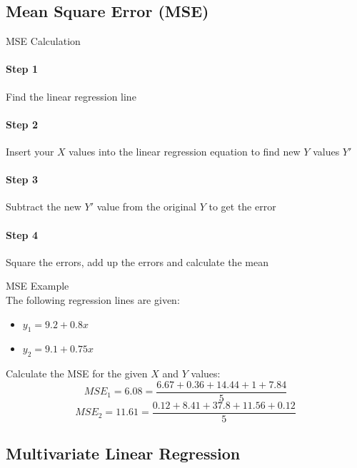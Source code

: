 
\subsection{Mean Square Error (MSE)}

\begin{KR}{MSE Calculation}\\
\paragraph{Step 1}
Find the linear regression line

\paragraph{Step 2}
Insert your $X$ values into the linear regression equation to find new $Y$ values $Y'$

\paragraph{Step 3}
Subtract the new $Y'$ value from the original $Y$ to get the error

\paragraph{Step 4}
Square the errors, add up the errors and calculate the mean
\end{KR}

\begin{example2}{MSE Example}\\
The following regression lines are given:
\begin{itemize}
    \item $y_1 = 9.2 + 0.8x$
    \item $y_2 = 9.1 + 0.75x$
\end{itemize}

Calculate the MSE for the given $X$ and $Y$ values:
$$MSE_1 = 6.08 = \frac{6.67 + 0.36 + 14.44 + 1 + 7.84}{5}$$
$$MSE_2 = 11.61 = \frac{0.12 + 8.41 + 37.8 + 11.56 + 0.12}{5}$$
\end{example2}


\subsection{Multivariate Linear Regression}

